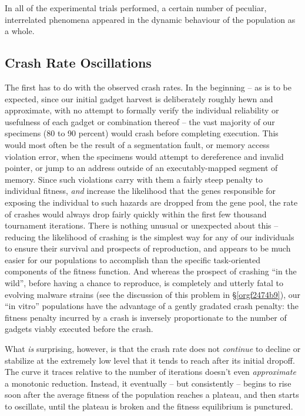 \documentclass[12pt,glossary]{dalthesis}
\begin{document}
In all of the experimental trials performed, a certain number of peculiar,
interrelated phenomena appeared in the dynamic behaviour of the population
as a whole. 

\subsection{Crash Rate Oscillations}
\label{sec:org705ec43}
The first has to do with the observed crash rates. In the beginning -- as is to
be expected, since our initial gadget harvest is deliberately roughly hewn
and approximate, with no attempt to formally verify the individual reliability
or usefulness of each gadget or combination thereof -- the vast majority of our
specimens (80 to 90 percent) would crash before completing execution. This would
most often be the result of a segmentation fault, or memory access violation error,
when the specimens would attempt to dereference and invalid pointer, or jump to an
address outside of an executably-mapped segment of memory. Since such violations
carry with them a fairly steep penalty to individual fitness, \emph{and} increase the
likelihood that the genes responsible for exposing the individual to such hazards
are dropped from the gene pool, the rate of crashes would always drop fairly quickly
within the first few thousand tournament iterations. There is nothing unusual or
unexpected about this -- reducing the likelihood of crashing is the simplest way
for any of our individuals to ensure their survival and prospects of reproduction,
and appears to be much easier for our populations to accomplish than the specific
task-oriented components of the fitness function. And whereas the prospect of
crashing ``in the wild'', before having a chance to reproduce, is completely and
utterly fatal to evolving malware strains (see the discussion of this problem
in \S \ref{orgf2474b9}), our ``in vitro'' populations have the advantage of a gently
gradated crash penalty: the fitness penalty incurred by a crash is inversely
proportionate to the number of gadgets viably executed before the crash.

What \emph{is} surprising, however, is that the crash rate does not \emph{continue}
to decline or stabilize at the extremely low level that it tends
to reach after its initial dropoff. The curve it traces relative to the
number of iterations doesn't even \emph{approximate} a monotonic reduction.
Instead, it eventually -- but consistently -- begins to rise soon after the
average fitness of the population reaches a plateau, and then starts to
oscillate, until the plateau is broken and the fitness equilibrium is
punctured. 
\end{document}
